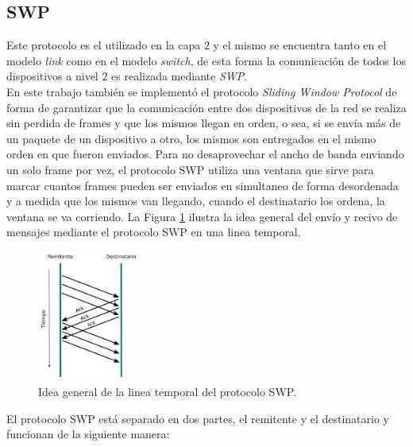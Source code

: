 \documentclass[10pt,a4paper]{article}
\begin{document}
\subsection{SWP}

Este protocolo es el utilizado en la capa $2$ y el mismo se encuentra tanto en el modelo \textit{link} como en el modelo \textit{switch}, de esta forma la comunicación de todos los dispositivos a nivel $2$ es realizada mediante \textit{SWP}.\\

En este trabajo también se implementó el protocolo \textit{Sliding Window Protocol} de forma de garantizar que la comunicación entre dos dispositivos de la red se realiza sin perdida de frames y que los mismos llegan en orden, o sea, si se envía más de un paquete de un dispositivo a otro, los mismos son entregados en el mismo orden en que fueron enviados. Para no desaprovechar el ancho de banda enviando un solo frame por vez, el protocolo SWP utiliza una ventana que sirve para marcar cuantos frames pueden ser enviados en simultaneo de forma desordenada y a medida que los mismos van llegando, cuando el destinatario los ordena, la ventana se va corriendo. La Figura \ref{figure: swp timeline} ilustra la idea general del envío y recivo de mensajes mediante el protocolo SWP en una linea temporal.\\

\begin{figure}[!htb]
    \centering
    \includegraphics[width = 0.3\textwidth]{img/png/swp-timeline.png}
    \caption{Idea general de la linea temporal del protocolo SWP.}
    \label{figure: swp timeline}
\end{figure}

El protocolo SWP está separado en dos partes, el remitente y el destinatario y funcionan de la siguiente manera:
\end{document}
